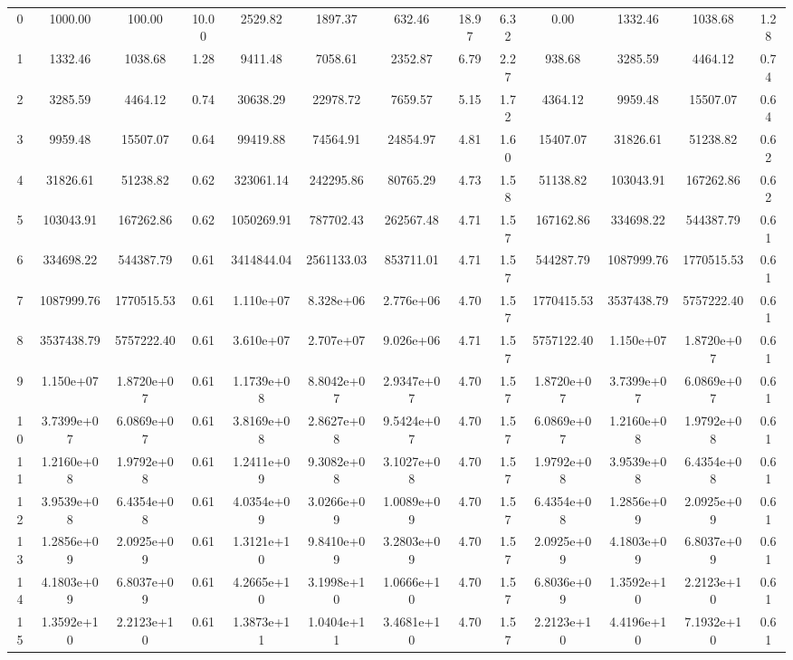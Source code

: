 \documentclass[12pt]{article}
\begin{document}
\begin{table}[H]
{\begin{tabular}{c|cccccccccccc}
    0  & 1000.00   & 100.00   & 10.00      & 2529.82   & 1897.37   & 632.46    & 18.97   & 6.32   & 0.00      & 1332.46   & 1038.68   & 1.28     \\
    1  & 1332.46   & 1038.68  & 1.28       & 9411.48   & 7058.61   & 2352.87   & 6.79    & 2.27   & 938.68    & 3285.59   & 4464.12   & 0.74     \\
    2  & 3285.59   & 4464.12  & 0.74       & 30638.29  & 22978.72  & 7659.57   & 5.15    & 1.72   & 4364.12   & 9959.48   & 15507.07  & 0.64     \\
    3  & 9959.48   & 15507.07 & 0.64       & 99419.88  & 74564.91  & 24854.97  & 4.81    & 1.60   & 15407.07  & 31826.61  & 51238.82  & 0.62     \\
    4  & 31826.61  & 51238.82 & 0.62       & 323061.14 & 242295.86 & 80765.29  & 4.73    & 1.58   & 51138.82  & 103043.91 & 167262.86 & 0.62     \\
    5  & 103043.91 & 167262.86& 0.62       & 1050269.91& 787702.43 & 262567.48 & 4.71    & 1.57   & 167162.86 & 334698.22 & 544387.79 & 0.61     \\
    6  & 334698.22 & 544387.79& 0.61       & 3414844.04& 2561133.03& 853711.01 & 4.71    & 1.57   & 544287.79 & 1087999.76& 1770515.53& 0.61     \\
    7  & 1087999.76& 1770515.53&0.61       & 1.110e+07 & 8.328e+06 & 2.776e+06 & 4.70    & 1.57   & 1770415.53& 3537438.79& 5757222.40& 0.61     \\
    8  & 3537438.79& 5757222.40&0.61       & 3.610e+07 & 2.707e+07 & 9.026e+06 & 4.71    & 1.57   & 5757122.40& 1.150e+07 & 1.8720e+07& 0.61     \\
    9  & 1.150e+07 & 1.8720e+07&0.61       & 1.1739e+08& 8.8042e+07& 2.9347e+07& 4.70    & 1.57   & 1.8720e+07& 3.7399e+07& 6.0869e+07& 0.61     \\
    10 & 3.7399e+07& 6.0869e+07&0.61       & 3.8169e+08& 2.8627e+08& 9.5424e+07& 4.70    & 1.57   & 6.0869e+07& 1.2160e+08& 1.9792e+08& 0.61     \\
    11 & 1.2160e+08& 1.9792e+08&0.61       & 1.2411e+09& 9.3082e+08& 3.1027e+08& 4.70    & 1.57   & 1.9792e+08& 3.9539e+08& 6.4354e+08& 0.61     \\
    12 & 3.9539e+08& 6.4354e+08&0.61       & 4.0354e+09& 3.0266e+09& 1.0089e+09& 4.70    & 1.57   & 6.4354e+08& 1.2856e+09& 2.0925e+09& 0.61     \\
    13 & 1.2856e+09& 2.0925e+09&0.61       & 1.3121e+10& 9.8410e+09& 3.2803e+09& 4.70    & 1.57   & 2.0925e+09& 4.1803e+09& 6.8037e+09& 0.61     \\
    14 & 4.1803e+09& 6.8037e+09&0.61       & 4.2665e+10& 3.1998e+10& 1.0666e+10& 4.70    & 1.57   & 6.8036e+09& 1.3592e+10& 2.2123e+10& 0.61     \\
    15 & 1.3592e+10& 2.2123e+10&0.61       & 1.3873e+11& 1.0404e+11& 3.4681e+10& 4.70    & 1.57   & 2.2123e+10& 4.4196e+10& 7.1932e+10& 0.61     \\
    \hline

    \end{tabular}}
    \end{table}
\end{document}
